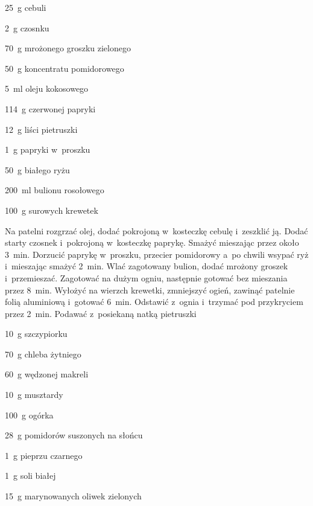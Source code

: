 \documentclass[../main.tex]{subfiles}
\begin{document}
\begin{Ingred}
    \item \qty{25}{\gram} cebuli
    \item \qty{2}{\gram} czosnku
    \item \qty{70}{\gram} mrożonego groszku zielonego
    \item \qty{50}{\gram} koncentratu pomidorowego
    \item \qty{5}{\milli\litre} oleju kokosowego
    \item \qty{114}{\gram} czerwonej papryki
    \item \qty{12}{\gram} liści pietruszki
    \item \qty{1}{\gram} papryki w~proszku
    \item \qty{50}{\gram} białego ryżu
    \item \qty{200}{\milli\litre} bulionu rosołowego
    \item \qty{100}{\gram} surowych krewetek
\end{Ingred}

Na patelni rozgrzać olej, dodać pokrojoną w~kosteczkę cebulę i~zeszklić ją.
Dodać starty czosnek i~pokrojoną w~kosteczkę paprykę. Smażyć mieszając przez
około \qty{3}{\minute}. Dorzucić paprykę w~proszku, przecier pomidorowy a~po
chwili wsypać ryż i~mieszając smażyć \qty{2}{\minute}. Wlać zagotowany bulion,
dodać mrożony groszek i~przemieszać. Zagotować na dużym ogniu, następnie
gotować bez mieszania przez \qty{8}{\minute}. Wyłożyć na wierzch krewetki,
zmniejszyć ogień, zawinąć patelnie folią aluminiową i~gotować \qty{6}{\minute}.
Odstawić z~ognia i~trzymać pod przykryciem przez \qty{2}{\minute}. Podawać
z~posiekaną natką pietruszki


\begin{Ingred}
    \item \qty{10}{\gram} szczypiorku
    \item \qty{70}{\gram} chleba żytniego
    \item \qty{60}{\gram} wędzonej makreli
    \item \qty{10}{\gram} musztardy
    \item \qty{100}{\gram} ogórka
    \item \qty{28}{\gram} pomidorów suszonych na słońcu
    \item \qty{1}{\gram} pieprzu czarnego
    \item \qty{1}{\gram} soli białej
    \item \qty{15}{\gram} marynowanych oliwek zielonych
\end{Ingred}
\end{document}
